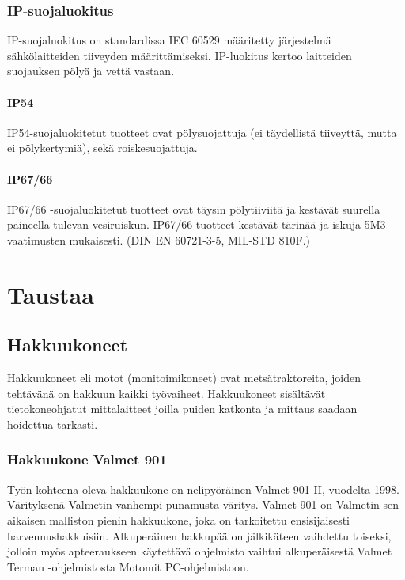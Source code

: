 \documentclass[11pt,a4paper,oneside,article]{memoir}
\begin{document}
\subsection{IP-suojaluokitus}

IP-suojaluokitus on standardissa IEC 60529 määritetty järjestelmä
sähkölaitteiden tiiveyden määrittämiseksi. IP-luokitus kertoo laitteiden
suojauksen pölyä ja vettä vastaan. \cite{IEC60529}

\subsubsection{IP54}

IP54-suojaluokitetut tuotteet ovat pölysuojattuja (ei täydellistä
tiiveyttä, mutta ei pölykertymiä), sekä roiskesuojattuja.

\subsubsection{IP67/66}

IP67/66 -suojaluokitetut tuotteet ovat täysin pölytiiviitä ja kestävät
suurella paineella tulevan vesiruiskun. IP67/66-tuotteet kestävät
tärinää ja iskuja 5M3-vaatimusten mukaisesti. (DIN EN 60721-3-5, MIL-STD
810F.)

\chapter{Taustaa}
\section{Hakkuukoneet}

Hakkuukoneet eli motot (monitoimikoneet) ovat metsätraktoreita, joiden
tehtävänä on hakkuun kaikki työvaiheet. Hakkuukoneet sisältävät
tietokoneohjatut mittalaitteet joilla puiden katkonta ja mittaus saadaan
hoidettua tarkasti.

\subsection{Hakkuukone Valmet 901}

Työn kohteena oleva hakkuukone on nelipyöräinen Valmet 901 II, vuodelta 1998. Värityksenä Valmetin vanhempi punamusta-väritys. Valmet 901 on Valmetin sen aikaisen malliston pienin hakkuukone, joka on tarkoitettu ensisijaisesti harvennushakkuisiin. Alkuperäinen hakkupää on jälkikäteen vaihdettu toiseksi, jolloin myös apteeraukseen käytettävä ohjelmisto vaihtui alkuperäisestä Valmet Terman -ohjelmistosta Motomit PC-ohjelmistoon.
\end{document}
